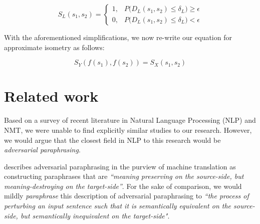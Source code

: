 \documentclass[11pt,a4paper]{article}
\begin{document}
\begin{equation}
  \label{bounded_isometry_probability_eqn}
  S_L(s_1,s_2) =
  \begin{cases}
    1, &P\big(D_L(s_1,s_2) \leq \delta_L\big) \geq \epsilon \\
    0, &P\big(D_L(s_1,s_2) \leq \delta_L\big) < \epsilon
  \end{cases}
\end{equation}

With the aforementioned simplifications, we now re-write our equation for approximate isometry as follows:

\begin{equation}  
  \label{exact_approx_isometry_eqn}
  S_Y(f(s_1),f(s_2)) = S_X(s_1,s_2)
\end{equation}


\section{Related work}

Based on a survey of recent literature in Natural Language Processing (NLP) and NMT, we were unable to find explicitly similar studies to our research. However, we would argue that the closest field in NLP to this research would be \textit{adversarial paraphrasing}.

\citet{michel2019evaluation} describes adversarial paraphrasing in the purview of machine translation as constructing paraphrases that are \textit{``meaning preserving on the source-side, but meaning-destroying on the target-side''}. For the sake of comparison, we would mildly \textit{paraphrase} this description of adversarial paraphrasing to \textit{``the process of perturbing an input sentence such that it is semantically equivalent on the source-side, but semantically inequivalent on the target-side"}.
\end{document}
